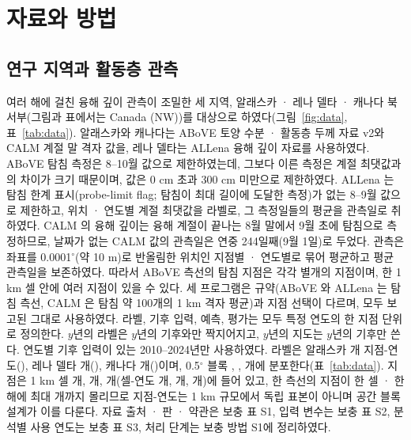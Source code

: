 \section{자료와 방법}\label{sec:methods}

\subsection{연구 지역과 활동층 관측}
여러 해에 걸친 융해 깊이 관측이 조밀한 세 지역, 알래스카 · 레나 델타 · 캐나다 북서부(그림과 표에서는 Canada (NW))를 대상으로 하였다(그림~\ref{fig:data}, 표~\ref{tab:data}). 알래스카와 캐나다는 ABoVE 토양 수분 · 활동층 두께 자료 v2\cite{Moore2025}와 CALM 계절 말 격자 값\cite{Streletskiy2025}을, 레나 델타는 ALLena 융해 깊이 자료\cite{Veremeeva2025}를 사용하였다. ABoVE 탐침 측정은 8--10월 값으로 제한하였는데, 그보다 이른 측정은 계절 최댓값과의 차이가 크기 때문이며, 값은 0 cm 초과 300 cm 미만으로 제한하였다. ALLena 는 탐침 한계 표시(probe-limit flag; 탐침이 최대 길이에 도달한 측정)가 없는 8--9월 값으로 제한하고, 위치 · 연도별 계절 최댓값을 라벨로, 그 측정일들의 평균을 관측일로 취하였다. CALM 의 융해 깊이는 융해 계절이 끝나는 8월 말에서 9월 초에 탐침으로 측정하므로\cite{Nelson1997,Brown2000}, 날짜가 없는 CALM 값의 관측일은 연중 244일째(9월 1일)로 두었다. 관측은 좌표를 0.0001$^\circ$(약 10 m)로 반올림한 위치인 지점별 · 연도별로 묶어 평균하고 평균 관측일을 보존하였다. 따라서 ABoVE 측선의 탐침 지점은 각각 별개의 지점이며, 한 1 km 셀 안에 여러 지점이 있을 수 있다. 세 프로그램은 규약(ABoVE 와 ALLena 는 탐침 측선, CALM 은 탐침 약 100개의 1 km 격자 평균)과 지점 선택이 다르며, 모두 보고된 그대로 사용하였다. 라벨, 기후 입력, 예측, 평가는 모두 특정 연도의 한 지점 단위로 정의한다. $y$년의 라벨은 $y$년의 기후와만 짝지어지고, $y$년의 지도는 $y$년의 기후만 쓴다. 연도별 기후 입력이 있는 2010--2024년만 사용하였다. 라벨은 알래스카 \nncyAk{}개 지점-연도(\nyrsAkko), 레나 델타 \nncyLe{}개(\nyrsLeko), 캐나다 \nncyCa{}개(\nyrsCako)이며, 0.5$^\circ$ 블록 \nnblkAk, \nnblkLe, \nnblkCa{}개에 분포한다(표~\ref{tab:data}). 지점은 1 km 셀 \nnkmcellAk{}개, \nnkmcellLe{}개, \nnkmcellCa{}개(셀-연도 \nnkmcyAk{}개, \nnkmcyLe{}개, \nnkmcyCa{}개)에 들어 있고, 한 측선의 지점이 한 셀 · 한 해에 최대 \nnkmmaxAk{}개까지 몰리므로 지점-연도는 1 km 규모에서 독립 표본이 아니며 공간 블록 설계가 이를 다룬다. 자료 출처 · 판 · 약관은 보충 표 S1, 입력 변수는 보충 표 S2, 분석별 사용 연도는 보충 표 S3, 처리 단계는 보충 방법 S1에 정리하였다.



